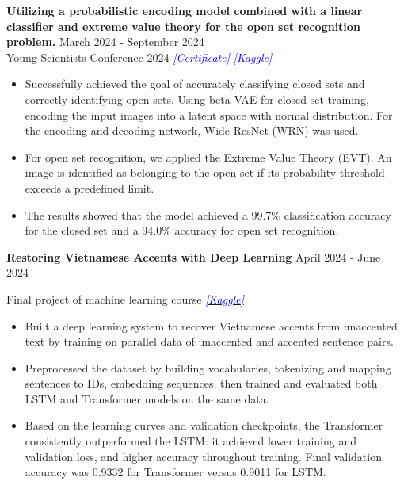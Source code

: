\documentclass[11pt]{article}
\begin{document}
    
    \textbf{Utilizing a probabilistic encoding model combined with a linear classifier and extreme value theory for the open set recognition problem.} \hfill March 2024 - September 2024 \\
    Young Scientists Conference 2024
    \hfill \href{https://drive.google.com/file/d/1l1SqZIbdWwFyhkkkd7IVw5bSU6gou24q/view?usp=sharing}{\textcolor{blue}{\textit{[Certificate]}}} \href{https://www.kaggle.com/code/taitruong256/openset-recognization-pytorch}{\textcolor{blue}{\textit{[Kaggle]}}}
    
    \begin{itemize}[noitemsep, topsep=0pt, partopsep=0pt, parsep=0pt]
        
        \item Successfully achieved the goal of accurately classifying closed sets and correctly identifying open sets. Using beta-VAE for closed set training, encoding the input images into a latent space with normal distribution. For the encoding and decoding network, Wide ResNet (WRN) was used.

        \item For open set recognition, we applied the Extreme Value Theory (EVT). An image is identified as belonging to the open set if its probability threshold exceeds a predefined limit.
        
        \item The results showed that the model achieved a 99.7\% classification accuracy for the closed set and a 94.0\% accuracy for open set recognition.
    \end{itemize}
    
    \vspace{12pt}
    
    \textbf{Restoring Vietnamese Accents with Deep Learning} \hfill April 2024 - June 2024
    
    Final project of machine learning course 
    \hfill 
    \href{https://www.kaggle.com/code/taitruong256/diacritic-restoration-for-non-diacritic-vietnamese}{\textcolor{blue}{\textit{[Kaggle]}}}
    \begin{itemize}[noitemsep, topsep=0pt, partopsep=0pt, parsep=0pt]
        \item Built a deep learning system to recover Vietnamese accents from unaccented text by training on parallel data of unaccented and accented sentence pairs.
        \item Preprocessed the dataset by building vocabularies, tokenizing and mapping sentences to IDs, embedding sequences, then trained and evaluated both LSTM and Transformer models on the same data.
        \item Based on the learning curves and validation checkpoints, the Transformer consistently outperformed the LSTM: it achieved lower training and validation loss, and higher accuracy throughout training. Final validation accuracy was 0.9332 for Transformer versus 0.9011 for LSTM.
    \end{itemize}
\end{document}
